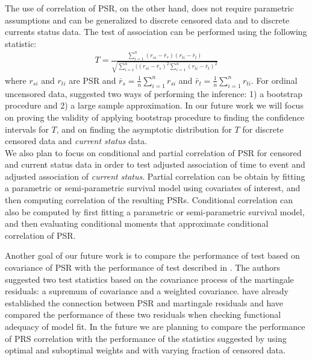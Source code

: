 \documentclass[]{article}
\begin{document}
The use of correlation of PSR, on the other hand, does not require parametric assumptions and can be generalized to discrete censored data and to discrete currents status data. The test of association can be performed using the following statistic:
$$
\begin{aligned}
	T = \frac{\sum_{i=1}^{n} (r_{si} - \bar{r}_s)(r_{ti} - \bar{r}_t)}{\sqrt{\sum_{i=1}^{n} ((r_{si} - \bar{r}_s)^2\sum_{i=1}^{n} (r_{ti} - \bar{r}_t)^2}}
\end{aligned}
$$
where $r_{si}$ and $r_{ti}$ are PSR and $\bar{r}_s = \frac{1}{n}\sum_{i=1}^{n} r_{si}$ and $\bar{r}_t = \frac{1}{n}\sum_{i=1}^{n} r_{ti}$. For ordinal uncensored data, \cite{li2010test} suggested two ways of performing the inference: 1) a bootstrap procedure and 2) a large sample approximation. In our future work we will focus on proving the validity of applying bootstrap procedure to finding the confidence intervals for $T$, and on finding the asymptotic distribution for $T$ for discrete censored data and \emph{current status} data.\\

We also plan to focus on conditional and partial correlation of PSR for censored and current status data in order to test adjusted association of time to event and adjusted association of \emph{current status}. Partial correlation can be obtain by fitting a parametric or semi-parametric survival model using covariates of interest, and then computing correlation of the resulting PSRs. Conditional correlation can also be computed by first fitting a parametric or semi-parametric survival model, and then evaluating conditional moments that approximate conditional correlation of PSR.

Another goal of our future work is to compare the performance of test based on covariance of PSR with the performance of test described in \cite{shih1996tests}. The authors suggested two test statistics based on the covariance process of the martingale residuals: a supremum of covariance and a weighted covariance. \cite{shepherd2016probability} have already established the connection between PSR and martingale residuals and have compared the performance of these two residuals when checking functional adequacy of model fit. In the future we are planning to compare the performance of PRS correlation with the performance of the statistics suggested by \cite{shih1996tests} using optimal and suboptimal weights and with varying fraction of censored data.
\end{document}
